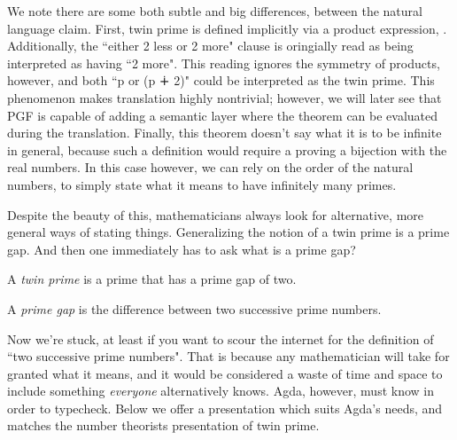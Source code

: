 We note there are some both subtle and big differences, between the natural
language claim. First, twin prime is defined implicitly via a product
expression, . Additionally, the ``either 2 less or 2 more" clause is
oringially read as being interpreted as having ``2 more". This reading ignores
the symmetry of products, however, and both ``p or (p ∔ 2)" could be interpreted
as the twin prime. This phenomenon makes translation highly nontrivial; however,
we will later see that PGF is capable of adding a semantic layer where the
theorem can be evaluated during the translation. Finally, this theorem doesn't
say what it is to be infinite in general, because such a definition would
require a proving a bijection with the real numbers. In this case however, we
can rely on the order of the natural numbers, to simply state what it means to
have infinitely many primes.

Despite the beauty of this, mathematicians always look for alternative, more
general ways of stating things. Generalizing the notion of a twin prime is a
prime gap. And then one immediately has to ask what is a prime gap?

\begin{definition}\label{def:def2}
A \emph{twin prime} is a prime that has a prime gap of two.
\end{definition}
\begin{definition}\label{def:def3}
A \emph{prime gap} is the difference between two successive prime numbers.
\end{definition}

Now we're stuck, at least if you want to scour the internet for the definition
of ``two successive prime numbers". That is because any mathematician will take
for granted what it means, and it would be considered a waste of time and space
to include something \emph{everyone} alternatively knows. Agda, however, must
know in order to typecheck. Below we offer a presentation which suits Agda's
needs, and matches the number theorists presentation of twin prime.

